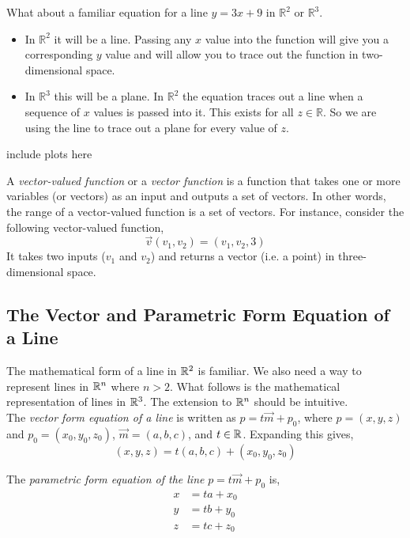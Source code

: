 \documentclass[12pt]{article}
\begin{document}
 What about a familiar equation for a line $y=3x+9$ in $\mathbb{R}^2$ or $\mathbb{R}^3$.
\begin{itemize}
\item In $\mathbb{R}^2$ it will be a line. Passing any $x$ value into the function will give you a corresponding $y$ value and will allow you to trace out the function in two-dimensional space.
\item In $\mathbb{R}^3$ this will be a plane. In $\mathbb{R}^2$ the equation traces out a line when a sequence of $x$ values is passed into it. This exists for all $z\in\mathbb{R}$. So we are using the line to trace out a plane for every value of $z$. 
\end{itemize}

{\color{red}include plots here}

 A \emph{vector-valued function} or a \emph{vector function} is a function that takes one or more variables (or vectors) as an input and outputs a set of vectors. In other words, the range of a vector-valued function is a set of vectors. For instance, consider the following vector-valued function,
\[
\vec{v}(v_1,v_2) = (v_1,v_2,3)
\]
It takes two inputs ($v_1$ and $v_2$) and returns a vector (i.e. a point) in three-dimensional space. \\

\subsection{The Vector and Parametric Form Equation of a Line}

The mathematical form of a line in $\mathbb{R}^2$ is familiar. We also need a way to represent lines in $\mathbb{R}^n$ where $n>2$. What follows is the mathematical representation of lines in $\mathbb{R}^3$. The extension to $\mathbb{R}^n$ should be intuitive. \\

The \emph{vector form equation of a line} is written as $p=t\vec{m}+p_0$, where $p=(x,y,z)$ and $p_0 = (x_0,y_0,z_0)$, $\vec{m} = (a,b,c)$, and $t\in\mathbb{R}$. Expanding this gives,
\[
(x,y,z) = t(a,b,c) + (x_0,y_0,z_0)
\]

 The \emph{parametric form equation of the line} $p=t\vec{m}+p_0$ is,
\begin{align*}
x &= ta + x_0 \\
y &= tb + y_0 \\
z &= tc + z_0 \\
\end{align*}
\end{document}

